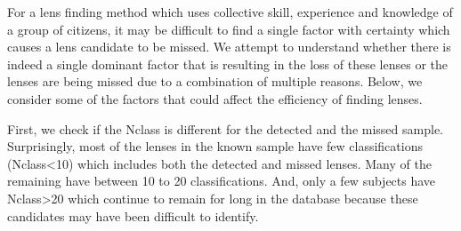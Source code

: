 \documentclass[useAMS,usenatbib,a4paper]{mn2e}
\begin{document}
For a lens finding method which uses collective skill, experience and
knowledge of a group of citizens, it may be difficult to find a single
factor with certainty which causes a lens candidate to be missed. We
attempt to understand whether there is indeed a single dominant factor
that is resulting in the loss of these lenses or the lenses are being
missed due to a combination of multiple reasons. Below, we consider some
of the factors that could affect the efficiency of finding lenses.

First, we check if the Nclass is different for the detected and the
missed sample. Surprisingly, most of the lenses in the known sample have
few classifications (Nclass<10) which includes both the detected and
missed lenses. Many of the remaining have between 10 to 20
classifications. And, only a few subjects have Nclass>20 which continue
to remain for long in the database because these candidates may have
been difficult to identify.
  
\end{document}

